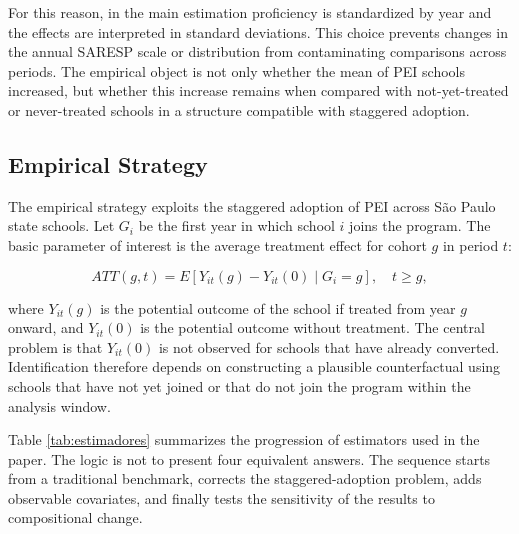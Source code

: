 For this reason, in the main estimation proficiency is standardized by year and the effects are interpreted in standard deviations. This choice prevents changes in the annual SARESP scale or distribution from contaminating comparisons across periods. The empirical object is not only whether the mean of PEI schools increased, but whether this increase remains when compared with not-yet-treated or never-treated schools in a structure compatible with staggered adoption.

\subsection{Empirical Strategy} \label{sec:empiricalstrategy}

The empirical strategy exploits the staggered adoption of PEI across São Paulo state schools. Let $G_i$ be the first year in which school $i$ joins the program. The basic parameter of interest is the average treatment effect for cohort $g$ in period $t$:

\begin{equation}
ATT(g,t) = E\left[Y_{it}(g) - Y_{it}(0) \mid G_i=g\right], \quad t \geq g,
\end{equation}

where $Y_{it}(g)$ is the potential outcome of the school if treated from year $g$ onward, and $Y_{it}(0)$ is the potential outcome without treatment. The central problem is that $Y_{it}(0)$ is not observed for schools that have already converted. Identification therefore depends on constructing a plausible counterfactual using schools that have not yet joined or that do not join the program within the analysis window.

Table \ref{tab:estimadores} summarizes the progression of estimators used in the paper. The logic is not to present four equivalent answers. The sequence starts from a traditional benchmark, corrects the staggered-adoption problem, adds observable covariates, and finally tests the sensitivity of the results to compositional change.

